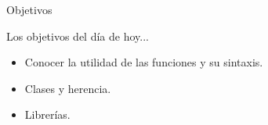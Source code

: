 \begin{frame}[t]{Objetivos}\vspace{10pt}

Los objetivos del día de hoy...

\begin{itemize}
	\item Conocer la utilidad de las funciones y su sintaxis.
	\item Clases y herencia.
	\item Librerías.
\end{itemize}

\end{frame}